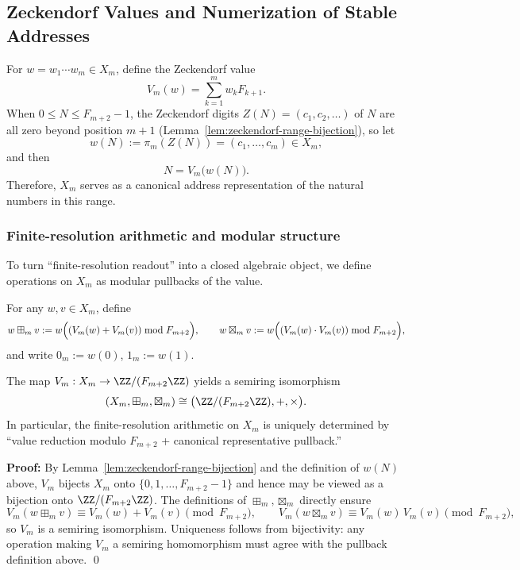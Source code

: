 \subsection{Zeckendorf Values and Numerization of Stable Addresses}\label{subsec:emergent-arithmetic-zeckendorf-value-address}

For $w=w_1\cdots w_m\in X_m$, define the Zeckendorf value
\[
V_m(w)=\sum_{k=1}^m w_k F_{k+1}.
\]
When $0\le N\le F_{m+2}-1$, the Zeckendorf digits $Z(N)=(c_1,c_2,\dots)$ of $N$ are all zero beyond position $m+1$ (Lemma~\ref{lem:zeckendorf-range-bijection}), so let
\[
w(N):=\pi_m(Z(N))=(c_1,\dots,c_m)\in X_m,
\]
and then
\[
N=V_m\bigl(w(N)\bigr).
\]
Therefore, $X_m$ serves as a canonical address representation of the natural numbers in this range.

\subsubsection{Finite-resolution arithmetic and modular structure}
To turn ``finite-resolution readout'' into a closed algebraic object, we define operations on $X_m$ as modular pullbacks of the value.

\begin{definition}
For any $w,v\in X_m$, define
\[
w\boxplus_m v:=w\Bigl((V_m(w)+V_m(v))\bmod F_{m+2}\Bigr),
\qquad
w\boxtimes_m v:=w\Bigl((V_m(w)\cdot V_m(v))\bmod F_{m+2}\Bigr),
\]
and write $0_m:=w(0)$, $1_m:=w(1)$.
\end{definition}

\begin{theorem}
\label{thm:finite-resolution-mod}
The map $V_m:X_m\to\ZZ/(F_{m+2}\ZZ)$ yields a semiring isomorphism
\[
(X_m,\boxplus_m,\boxtimes_m)\cong\bigl(\ZZ/(F_{m+2}\ZZ),+,\times\bigr).
\]
In particular, the finite-resolution arithmetic on $X_m$ is uniquely determined by ``value reduction modulo $F_{m+2}$ + canonical representative pullback.''
\end{theorem}

\textbf{Proof:}
By Lemma~\ref{lem:zeckendorf-range-bijection} and the definition of $w(N)$ above, $V_m$ bijects $X_m$ onto $\{0,1,\dots,F_{m+2}-1\}$ and hence may be viewed as a bijection onto $\ZZ/(F_{m+2}\ZZ)$. The definitions of $\boxplus_m,\boxtimes_m$ directly ensure
\[
V_m(w\boxplus_m v)\equiv V_m(w)+V_m(v)\pmod{F_{m+2}},
\qquad
V_m(w\boxtimes_m v)\equiv V_m(w)\,V_m(v)\pmod{F_{m+2}},
\]
so $V_m$ is a semiring isomorphism. Uniqueness follows from bijectivity: any operation making $V_m$ a semiring homomorphism must agree with the pullback definition above. \qed

